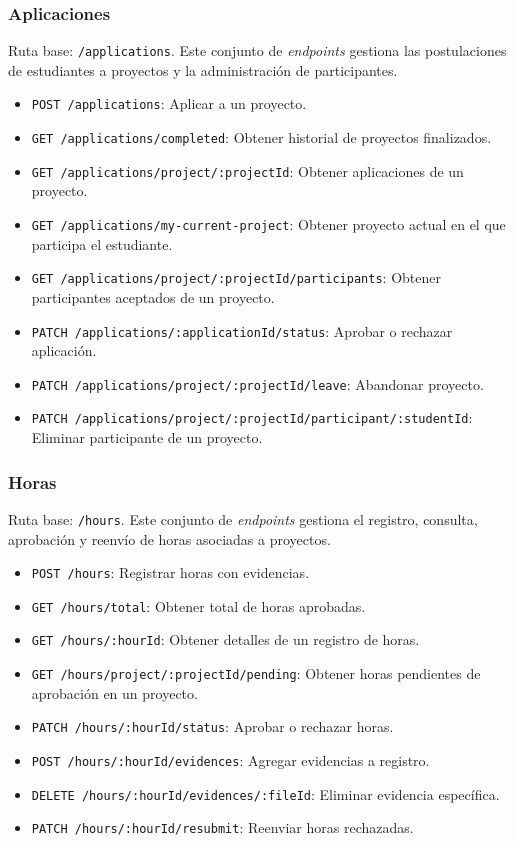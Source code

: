 \subsubsection{Aplicaciones}
Ruta base: \texttt{/applications}. Este conjunto de \textit{endpoints} gestiona las postulaciones de estudiantes
a proyectos y la administración de participantes.
\begin{itemize}
    \item \texttt{POST /applications}: Aplicar a un proyecto.
    \item \texttt{GET /applications/completed}: Obtener historial de proyectos finalizados.
    \item \texttt{GET /applications/project/:projectId}: Obtener aplicaciones de un proyecto.
    \item \texttt{GET /applications/my-current-project}: Obtener proyecto actual en el que participa el estudiante.
    \item \texttt{GET /applications/project/:projectId/participants}: Obtener participantes aceptados de un proyecto.
    \item \texttt{PATCH /applications/:applicationId/status}: Aprobar o rechazar aplicación.
    \item \texttt{PATCH /applications/project/:projectId/leave}: Abandonar proyecto.
    \item \texttt{PATCH /applications/project/:projectId/participant/:studentId}: Eliminar participante de un proyecto.
\end{itemize}

\subsubsection{Horas}
Ruta base: \texttt{/hours}. Este conjunto de \textit{endpoints} gestiona el registro, consulta, aprobación
y reenvío de horas asociadas a proyectos.
\begin{itemize}
    \item \texttt{POST /hours}: Registrar horas con evidencias.
    \item \texttt{GET /hours/total}: Obtener total de horas aprobadas.
    \item \texttt{GET /hours/:hourId}: Obtener detalles de un registro de horas.
    \item \texttt{GET /hours/project/:projectId/pending}: Obtener horas pendientes de aprobación en un proyecto.
    \item \texttt{PATCH /hours/:hourId/status}: Aprobar o rechazar horas.
    \item \texttt{POST /hours/:hourId/evidences}: Agregar evidencias a registro.
    \item \texttt{DELETE /hours/:hourId/evidences/:fileId}: Eliminar evidencia específica.
    \item \texttt{PATCH /hours/:hourId/resubmit}: Reenviar horas rechazadas.
\end{itemize}

